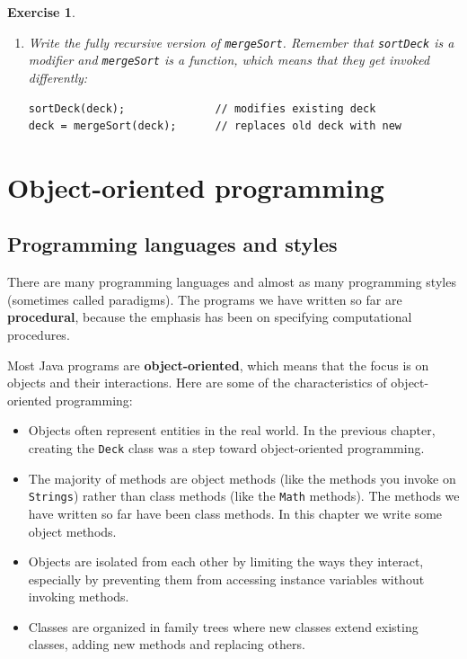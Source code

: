 \documentclass[12pt]{book}
\theoremstyle{exercise}
\newtheorem{exercise}{Exercise}[chapter]
\begin{document}
\begin{exercise}
\begin{enumerate}
\item Write the fully recursive version of {\tt mergeSort}.
Remember that {\tt sortDeck} is a modifier and {\tt mergeSort} is
a function, which means that they get invoked differently:

\begin{lstlisting}
sortDeck(deck);              // modifies existing deck
deck = mergeSort(deck);      // replaces old deck with new
\end{lstlisting}

\end{enumerate}
\end{exercise}



\chapter{Object-oriented programming}
\label{chap13}

\section{Programming languages and styles}

There are many programming languages and almost as many
programming styles (sometimes called paradigms).
The programs we have written so far are {\bf procedural},
because the emphasis has been on specifying computational procedures.

Most Java programs are {\bf object-oriented}, which means that
the focus is on objects and their interactions.
Here are some of the characteristics of object-oriented programming:

\begin{itemize}

\item Objects often represent entities in the real world.
  In the previous chapter, creating the {\tt Deck} class
  was a step toward object-oriented programming.

\item The majority of methods are object methods (like the methods you
  invoke on {\tt Strings}) rather than class methods (like the {\tt Math}
  methods).  The methods we have written so far have
  been class methods.  In this chapter we write some object methods.

\item Objects are isolated from each other by limiting the ways they
  interact, especially by preventing them from accessing
  instance variables without invoking methods.

\item Classes are organized in family trees where
  new classes extend existing classes, adding new methods and
  replacing others.

\end{itemize}
\end{document}
